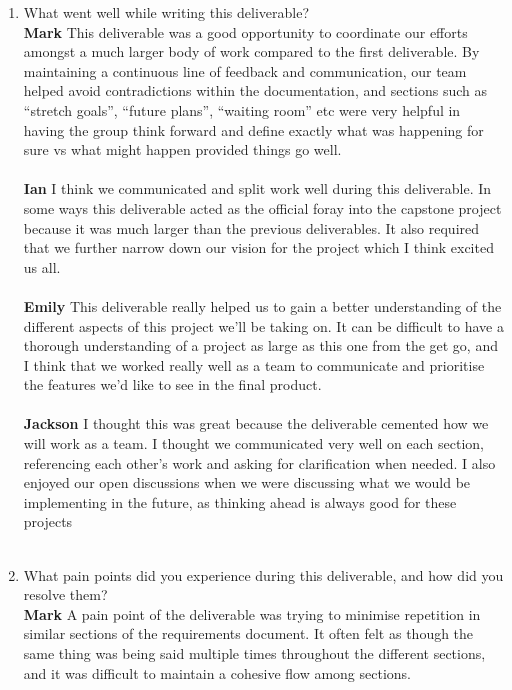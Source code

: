 \begin{enumerate}
  \item What went well while writing this deliverable? \\
  \textbf{Mark} This deliverable was a good opportunity to coordinate our efforts amongst a much larger body of work compared to the first deliverable. By maintaining a continuous line of feedback and communication, our team helped avoid contradictions within the documentation, and sections such as “stretch goals”, “future plans”, “waiting room” etc were very helpful in having the group think forward and define exactly what was happening for sure vs what might happen provided things go well.\\ \\
  \textbf{Ian}  I think we communicated and split work well during this deliverable. In some ways this deliverable acted as the official foray into the capstone project because it was much larger than the previous deliverables. It also required that we further narrow down our vision for the project which I think excited us all.  \\ \\
  \textbf{Emily} This deliverable really helped us to gain a better understanding of the different aspects of this project we’ll be taking on. It can be difficult to have a thorough understanding of a project as large as this one from the get go, and I think that we worked really well as a team to communicate and prioritise the features we’d like to see in the final product.\\ \\
  \textbf{Jackson}  I thought this was great because the deliverable cemented how we will work as a team. I thought we communicated very well on each section, referencing each other’s work and asking for clarification when needed. I also enjoyed our open discussions when we were discussing what we would be implementing in the future, as thinking ahead is always good for these projects \\ \\
  \item What pain points did you experience during this deliverable, and how did
  you resolve them? \\
  \textbf{Mark} A pain point of the deliverable was trying to minimise repetition in similar sections of the requirements document. It often felt as though the same thing was being said multiple times throughout the different sections, and it was difficult to maintain a cohesive flow among sections.\\ \\ 

\end{enumerate}
